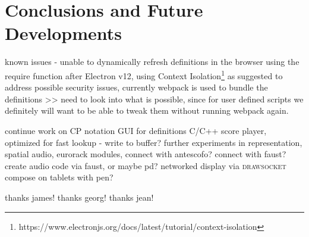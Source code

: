 \documentclass{article}
\def\drawsocket{\textsc{drawsocket}\xspace}
\begin{document}
\section{Conclusions and Future Developments}

known issues
- unable to dynamically refresh definitions in the browser using the require function after Electron v12, using Context Isolation\footnote{https://www.electronjs.org/docs/latest/tutorial/context-isolation} as suggested to address possible security issues, currently webpack is used to bundle the definitions
>> need to look into what is possible, since for user defined scripts we definitely will want to be able to tweak them without running webpack again.

continue work on CP notation
GUI for definitions
C/C++ score player, optimized for fast lookup - write to buffer?
further experiments in representation, spatial audio, eurorack modules, 
connect with antescofo?
connect with faust? create audio code via faust, or maybe pd?
networked display via \drawsocket compose on tablets with pen?

\begin{acknowledgments}
thanks james! thanks georg! thanks jean!
\end{acknowledgments} 

\balance %

\end{document}
